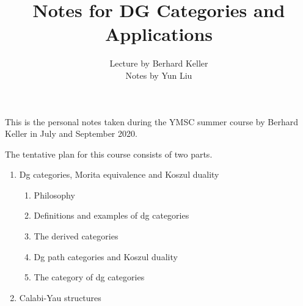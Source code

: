 
\title{Notes for DG Categories and Applications}
\author{Lecture by Berhard Keller \\ Notes by Yun Liu}
\date{}


\maketitle
\tableofcontents


This is the personal notes taken during the YMSC summer course by Berhard Keller in July and September 2020. 

The tentative plan for this course consists of two parts. 
\begin{enumerate}
    \item Dg categories, Morita equivalence and Koszul duality
    \begin{enumerate}
        \item Philosophy
        \item Definitions and examples of dg categories
        \item The derived categories
        \item Dg path categories and Koszul duality
        \item The category of dg categories
    \end{enumerate}
    \item Calabi-Yau structures
\end{enumerate}






